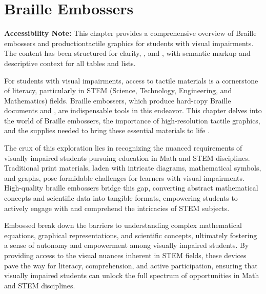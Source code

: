 \chapter{Braille Embossers}\label{ch4:braille-embossers}
\raggedright

\begin{raggedright}
	\textbf{Accessibility Note:} This chapter provides a comprehensive overview of Braille embossers and  productiontactile graphics for students with visual impairments. The content has been structured for clarity, , and , with semantic markup and descriptive context for all tables and lists.
\end{raggedright}

For students with visual impairments, access to tactile materials is a cornerstone of literacy, particularly in STEM (Science, Technology, Engineering, and Mathematics) fields. Braille embossers, which produce hard-copy Braille documents and , are indispensable tools in this endeavor. This chapter delves into the world of Braille embossers, the importance of high-resolution tactile graphics, and the supplies needed to bring these essential materials to life \cite{Perkins, TactileView, CreatingTactileGraphics, AELData}.

The crux of this exploration lies in recognizing the nuanced requirements of visually impaired students pursuing education in Math and STEM disciplines. Traditional print materials, laden with intricate diagrams, mathematical symbols, and graphs, pose formidable challenges for learners with visual impairments. High-quality braille embossers bridge this gap, converting abstract mathematical concepts and scientific data into tangible formats, empowering students to actively engage with and comprehend the intricacies of STEM subjects.

Embossed  break down the barriers to understanding complex mathematical equations, graphical representations, and scientific concepts, ultimately fostering a sense of autonomy and empowerment among visually impaired students. By providing access to the visual nuances inherent in STEM fields, these devices pave the way for literacy, comprehension, and active participation, ensuring that visually impaired students can unlock the full spectrum of opportunities in Math and STEM disciplines.\supercite{NYUWorkflow, ProBlind}

